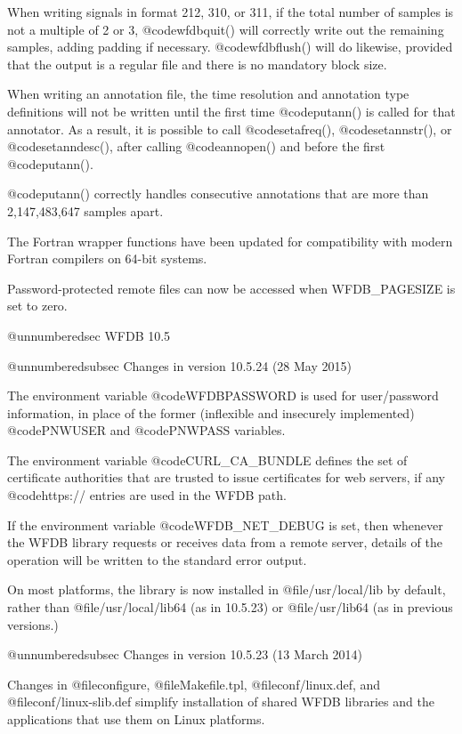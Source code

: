 {{{{{{{{When writing signals in format 212, 310, or 311, if the total number of samples
is not a multiple of 2 or 3, @code{wfdbquit()} will correctly write out the
remaining samples, adding padding if necessary.  @code{wfdbflush()} will do
likewise, provided that the output is a regular file and there is no mandatory
block size.

When writing an annotation file, the time resolution and annotation type
definitions will not be written until the first time @code{putann()} is called
for that annotator.  As a result, it is possible to call @code{setafreq()},
@code{setannstr()}, or @code{setanndesc()}, after calling @code{annopen()} and
before the first @code{putann()}.

@code{putann()} correctly handles consecutive annotations that are more than
2,147,483,647 samples apart.

The Fortran wrapper functions have been updated for compatibility with modern
Fortran compilers on 64-bit systems.

Password-protected remote files can now be accessed when WFDB_PAGESIZE is set
to zero.

@unnumberedsec WFDB 10.5

@unnumberedsubsec Changes in version 10.5.24 (28 May 2015)

The environment variable @code{WFDBPASSWORD} is used for user/password
information, in place of the former (inflexible and insecurely
implemented) @code{PNWUSER} and @code{PNWPASS} variables.

The environment variable @code{CURL_CA_BUNDLE} defines the set of
certificate authorities that are trusted to issue certificates for web
servers, if any @code{https://} entries are used in the WFDB path.

If the environment variable @code{WFDB_NET_DEBUG} is set, then
whenever the WFDB library requests or receives data from a remote
server, details of the operation will be written to the standard error
output.

On most platforms, the library is now installed in
@file{/usr/local/lib} by default, rather than @file{/usr/local/lib64}
(as in 10.5.23) or @file{/usr/lib64} (as in previous versions.)

@unnumberedsubsec Changes in version 10.5.23 (13 March 2014)

Changes in @file{configure}, @file{Makefile.tpl}, @file{conf/linux.def}, and
@file{conf/linux-slib.def} simplify installation of shared WFDB libraries and
the applications that use them on Linux platforms.

}}}}}}}}
